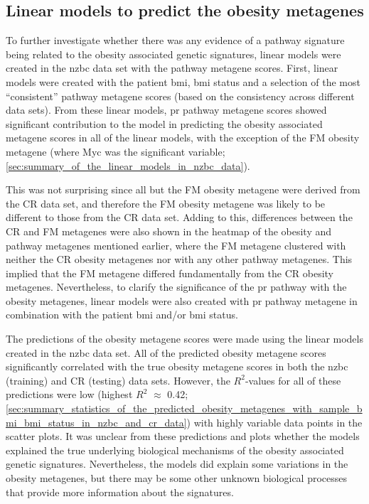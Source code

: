 \subsection{Linear models to predict the obesity metagenes}
\label{sub:linear_models_to_predict_obesity_metagenes}

To further investigate whether there was any evidence of a pathway signature being related to the obesity associated genetic signatures, linear models were created in the \gls{nzbc} data set with the pathway metagene scores.
First, linear models were created with the patient \gls{bmi}, \gls{bmi} status and a selection of the most ``consistent'' pathway metagene scores (based on the consistency across different data sets).
From these linear models, \gls{pr} pathway metagene scores showed significant contribution to the model in predicting the obesity associated metagene scores in all of the linear models, with the exception of the FM obesity metagene (where Myc was the significant variable; \cref{sec:summary_of_the_linear_models_in_nzbc_data}).

This was not surprising since all but the FM obesity metagene were derived from the CR data set, and therefore the FM obesity metagene was likely to be different to those from the CR data set.
Adding to this, differences between the CR and FM metagenes were also shown in the heatmap of the obesity and pathway metagenes mentioned earlier, where the FM metagene clustered with neither the CR obesity metagenes nor with any other pathway metagenes.
This implied that the FM metagene differed fundamentally from the CR obesity metagenes.
Nevertheless, to clarify the significance of the \gls{pr} pathway with the obesity metagenes, linear models were also created with \gls{pr} pathway metagene in combination with the patient \gls{bmi} and/or \gls{bmi} status.

The predictions of the obesity metagene scores were made using the linear models created in the \gls{nzbc} data set.
All of the predicted obesity metagene scores significantly correlated with the true obesity metagene scores in both the \gls{nzbc} (training) and CR (testing) data sets.
However, the $R^2$-values for all of these predictions were low (highest $R^2$ $\approx$ 0.42; \cref{sec:summary_statistics_of_the_predicted_obesity_metagenes_with_sample_bmi_bmi_status_in_nzbc_and_cr_data}) with highly variable data points in the scatter plots.
It was unclear from these predictions and plots whether the models explained the true underlying biological mechanisms of the obesity associated genetic signatures.
Nevertheless, the models did explain some variations in the obesity metagenes, but there may be some other unknown biological processes that provide more information about the signatures.

